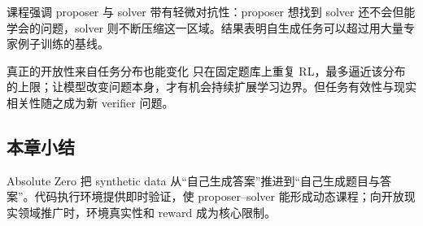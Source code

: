 
课程强调 proposer 与 solver 带有轻微对抗性：proposer 想找到 solver 还不会但能学会的问题，solver 则不断压缩这一区域。结果表明自生成任务可以超过用大量专家例子训练的基线。

\begin{importantbox}{真正的开放性来自任务分布也能变化}
只在固定题库上重复 RL，最多逼近该分布的上限；让模型改变问题本身，才有机会持续扩展学习边界。但任务有效性与现实相关性随之成为新 verifier 问题。
\end{importantbox}

\subsection{本章小结}

Absolute Zero 把 synthetic data 从“自己生成答案”推进到“自己生成题目与答案”。代码执行环境提供即时验证，使 proposer--solver 能形成动态课程；向开放现实领域推广时，环境真实性和 reward 成为核心限制。

